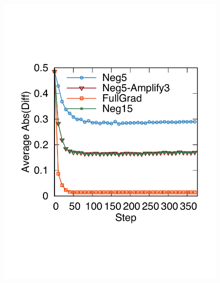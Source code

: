 \begin{figure}[ht]
	\centering
	\begin{minipage}{.31\textwidth}
		\centering
		\captionsetup{justification=centering,margin=0.1cm}
		\includegraphics[width=1\linewidth]{Graph/negSamp/L2Theory_Step.pdf}


\end{minipage}
\end{figure}
